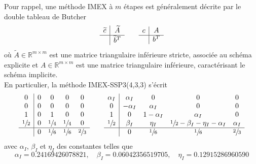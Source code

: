 \documentclass[11pt, a4paper, oneside]{report}
\begin{document}
Pour rappel, une méthode IMEX à $m$ étapes est généralement décrite par le double tableau de Butcher
\begin{equation}
    \begin{array}{c|c}
        \widetilde{c} & \widetilde{A} \\
        \hline
        & \widetilde{b}^T
    \end{array} \qquad
    \begin{array}{c|c}
        c & A \\
        \hline
        & b^T        
    \end{array}
\end{equation}
où $\widetilde{A} \in \mathbb{R}^{m \times m}$ est une matrice triangulaire inférieure stricte, associée au schéma explicite et ${A \in \mathbb{R}^{m \times m}}$ est une matrice triangulaire inférieure, caractérisant le schéma implicite. \\
En particulier, la méthode IMEX-SSP3(4,3,3) s'écrit
\begin{equation}
    \begin{array}{c|cccc}
        0 & 0 & 0 & 0 & 0 \\
        0 & 0 & 0 & 0 & 0 \\
        1 & 0 & 1 & 0 & 0 \\
        \sfrac{1}{2} & 0 & \sfrac{1}{4} & \sfrac{1}{4} & 0 \\
        \hline
        & 0 & \sfrac{1}{6} & \sfrac{1}{6} & \sfrac{2}{3}
    \end{array} \qquad
    \begin{array}{c|cccc}
        \alpha_I & \alpha_I & 0 & 0 & 0 \\
        0 & -\alpha_I & \alpha_I & 0 & 0 \\
        1 & 0 & 1-\alpha_I & \alpha_I & 0 \\
        \sfrac{1}{2} & \beta_I & \eta_I & \sfrac{1}{2} - \beta_I - \eta_I - \alpha_I & \alpha_I \\
        \hline
        & 0 & \sfrac{1}{6} & \sfrac{1}{6} & \sfrac{2}{3}
    \end{array}
\end{equation}
avec $\alpha_I$, $\beta_I$ et $\eta_I$ des constantes telles que
\begin{equation}
    \alpha_I = 0.24169426078821, \quad \beta_I = 0.06042356519705, \quad \eta_I = 0.12915286960590
\end{equation}
\end{document}
